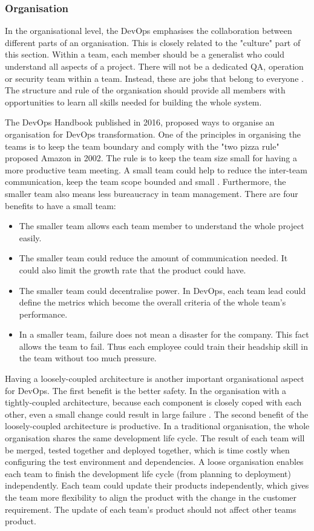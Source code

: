 \subsubsection[]{Organisation}
In the organisational level, the DevOps emphasises the collaboration between different parts of an organisation. This is closely related to the "culture" part of this section. 
Within a team, each member should be a generalist who could understand all aspects of a project. There will not be a dedicated QA, operation or security team within a team. Instead, these are jobs that belong to everyone \cite{feitelson2013development}\cite{kim2016devops}. The structure and rule of the organisation should provide all members with opportunities to learn all skills needed for building the whole system. 
\par
The DevOps Handbook \cite{kim2016devops} published in 2016, proposed ways to organise an organisation for DevOps transformation. One of the principles in organising the teams is to keep the team boundary and comply with the "two pizza rule" proposed Amazon in 2002. The rule is to keep the team size small for having a more productive team meeting.
A small team could help to reduce the inter-team communication, keep the team scope bounded and small \cite{kim2016devops}. Furthermore, the smaller team also means less bureaucracy in team management. There are four benefits to have a small team:
\begin{itemize}
    \item The smaller team allows each team member to understand the whole project easily.
    \item The smaller team could reduce the amount of communication needed. It could also limit the growth rate that the product could have.
    \item The smaller team could decentralise power. In DevOps, each team lead could define the metrics which become the overall criteria of the whole team's performance.
    \item In a smaller team, failure does not mean a disaster for the company. This fact allows the team to fail. Thus each employee could train their headship skill in the team without too much pressure. 
\end{itemize} 
\par
Having a loosely-coupled architecture is another important organisational aspect for DevOps. The first benefit is the better safety. In the organisation with a tightly-coupled architecture, because each component is closely coped with each other, even a small change could result in large failure \cite{kim2016devops}. The second benefit of the loosely-coupled architecture is productive. In a traditional organisation, the whole organisation shares the same development life cycle. The result of each team will be merged, tested together and deployed together, which is time costly when configuring the test environment and dependencies. A loose organisation enables each team to finish the development life cycle (from planning to deployment) independently. Each team could update their products independently, which gives the team more flexibility to align the product with the change in the customer requirement. 
The update of each team's product should not affect other teams product. 
